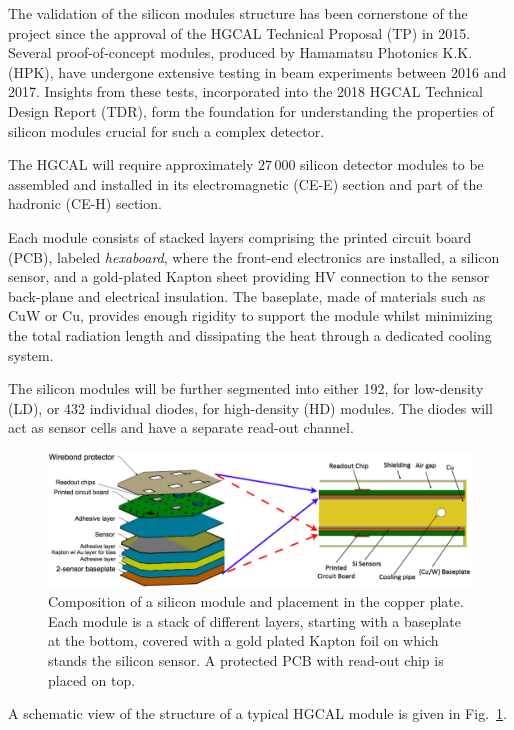 The validation of the silicon modules structure has been cornerstone of the project since the approval of the HGCAL Technical Proposal (TP) in 2015. Several proof-of-concept modules, produced by Hamamatsu Photonics K.K. (HPK), have undergone extensive testing in beam experiments between 2016 and 2017. Insights from these tests, incorporated into the 2018 HGCAL Technical Design Report (TDR), form the foundation for understanding the properties of silicon modules crucial for such a complex detector.

\bigbreak

The HGCAL will require approximately $27\,000$ silicon detector modules to be assembled and installed in its electromagnetic (CE-E) section and part of the hadronic (CE-H) section.

Each module consists of stacked layers comprising the printed circuit board (PCB), labeled \textit{hexaboard}, where the front-end electronics are installed, a silicon sensor, and a gold-plated Kapton sheet providing HV connection to the sensor back-plane and electrical insulation. The baseplate, made of materials such as CuW or Cu, provides enough rigidity to support the module whilst minimizing the total radiation length and dissipating the heat through a dedicated cooling system.

The silicon modules will be further segmented into either 192, for low-density (LD), or 432 individual diodes, for high-density (HD) modules. The diodes will act as sensor cells and have a separate read-out channel.

\begin{figure}
    \centering
    \includegraphics[width=0.9\linewidth]{Figures/HGCAL/ModuleDesign.png}
    \caption{Composition of a silicon module and placement in the copper plate. Each module is a stack of different layers, starting with a baseplate at the bottom, covered with a gold plated Kapton foil on which stands the silicon sensor. A protected PCB with read-out chip is placed on top.}
    \label{fig:ModuleDesign}
\end{figure}

A schematic view of the structure of a typical HGCAL module is given in Fig.~\ref{fig:ModuleDesign}.

